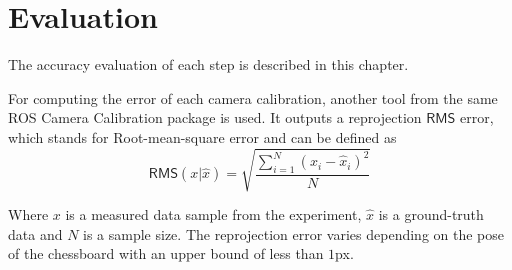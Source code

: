 \chapter{Evaluation}
\label{chapter:evaluation}

The accuracy evaluation of each step is described in this chapter.


For computing the error of each camera calibration, another tool from the same ROS Camera Calibration package is used.
It outputs a reprojection $\mathsf{RMS}$ error, which stands for Root-mean-square error and can be defined as
\begin{equation}
    \mathsf{RMS}(x | \hat{x} ) = \sqrt{\frac{\sum_{i=1}^{N}{(x_i - \hat{x}_i)^2}}{N}}
\end{equation}

Where $x$ is a measured data sample from the experiment, $\hat{x}$ is a ground-truth data and $N$ is a sample size.
The reprojection error varies depending on the pose of the chessboard with an upper bound of less than $1$px.
